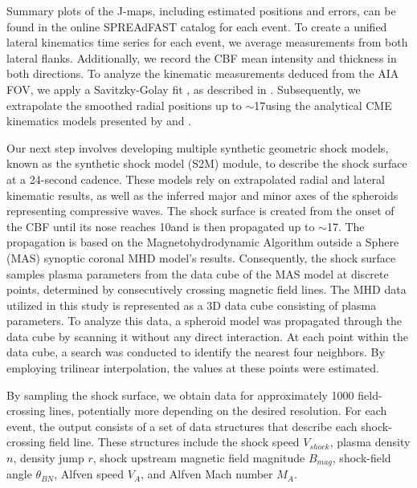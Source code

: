 Summary plots of the J-maps, including estimated positions and errors, can be found in the online SPREAdFAST catalog for each event. To create a unified lateral kinematics time series for each event, we average measurements from both lateral flanks. Additionally, we record the CBF mean intensity and thickness in both directions.
To analyze the kinematic measurements deduced from the AIA FOV, we apply a Savitzky-Golay fit \citep{savitzky_1964}, as described in \citet{kozarev_2019}. Subsequently, we extrapolate the smoothed radial positions up to $\sim$17\rsun using the analytical CME kinematics models presented by \citet{gallagher_2003} and \citet{byrne_2013}.

Our next step involves developing multiple synthetic geometric shock models, known as the synthetic shock model (S2M) module, to describe the shock surface at a 24-second cadence. These models rely on extrapolated radial and lateral kinematic results, as well as the inferred major and minor axes of the spheroids representing compressive waves. The shock surface is created from the onset of the CBF until its nose reaches 10\rsun and is then propagated up to $\sim$17\rsun. The propagation is based on the Magnetohydrodynamic Algorithm outside a Sphere (MAS) synoptic coronal MHD model's results. Consequently, the shock surface samples plasma parameters from the data cube of the MAS model at discrete points, determined by consecutively crossing magnetic field lines.
The MHD data utilized in this study is represented as a 3D data cube consisting of plasma parameters. To analyze this data, a spheroid model was propagated through the data cube by scanning it without any direct interaction. At each point within the data cube, a search was conducted to identify the nearest four neighbors. By employing trilinear interpolation, the values at these points were estimated.

By sampling the shock surface, we obtain data for approximately 1000 field-crossing lines, potentially more depending on the desired resolution. For each event, the output consists of a set of data structures that describe each shock-crossing field line. These structures include the shock speed $V_{shock}$, plasma density $n$, density jump $r$, shock upstream magnetic field magnitude $B_{mag}$, shock-field angle $\theta_{BN}$, Alfven speed $V_A$, and Alfven Mach number $M_A$.

